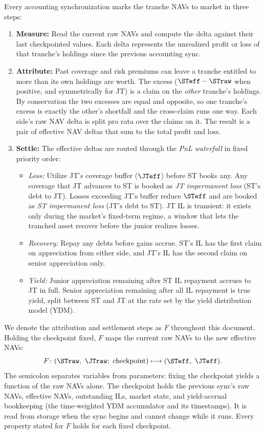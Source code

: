 Every accounting synchronization marks the tranche NAVs to market in three steps:

\begin{enumerate}
  \item \textbf{Measure:} Read the current raw NAVs and
    compute the delta against their last checkpointed values. Each delta
    represents the unrealized profit or loss of that tranche's holdings
    since the previous accounting sync.
  \item \textbf{Attribute:} Past coverage and risk premiums can leave a
    tranche entitled to more than its own holdings are worth. The excess
    ($\STeff - \STraw$ when positive, and symmetrically for JT) is a
    claim on the \emph{other} tranche's holdings. By conservation the two
    excesses are equal and opposite, so one tranche's excess is exactly
    the other's shortfall and the cross-claim runs one way. Each side's
    raw NAV delta is split pro rata over the claims on it. The result is
    a pair of effective NAV deltas that sum to the total profit and loss.
  \item \textbf{Settle:} The effective deltas are routed through the
    \emph{PnL waterfall} in fixed priority order:
    \begin{itemize}
      \item \emph{Loss:} Utilize JT's coverage buffer ($\JTeff$) before ST books
        any. Any coverage that JT advances to ST is booked as \emph{JT
        impermanent loss} (ST's debt to JT). Losses exceeding JT's
        buffer reduce $\STeff$ and are booked as \emph{ST impermanent
        loss} (JT's debt to ST). JT IL is transient: it exists only
        during the market's fixed-term regime, a window that lets the
        tranched asset recover before the junior realizes losses.
      \item \emph{Recovery:} Repay any debts before gains accrue.
        ST's IL has the first claim on appreciation from either side,
        and JT's IL has the second claim on senior appreciation only.
      \item \emph{Yield:} Junior appreciation remaining after ST IL
        repayment accrues to JT in full. Senior appreciation remaining
        after all IL repayment is true yield, split between ST and JT
        at the rate set by the yield distribution model (YDM).
    \end{itemize}
\end{enumerate}

We denote the attribution and settlement steps as $F$ throughout this
document. Holding the checkpoint fixed, $F$ maps the current raw NAVs
to the new effective NAVs:
\[
  F\colon (\STraw,\ \JTraw;\ \text{checkpoint}) \longmapsto (\STeff,\ \JTeff).
\]
The semicolon separates variables from parameters: fixing the
checkpoint yields a function of the raw NAVs alone. The checkpoint holds the previous sync's raw NAVs,
effective NAVs, outstanding ILs, market state, and yield-accrual
bookkeeping (the time-weighted YDM accumulator and its timestamps). It
is read from storage when the sync begins and cannot change while it
runs. Every property stated for $F$ holds for each fixed checkpoint.


